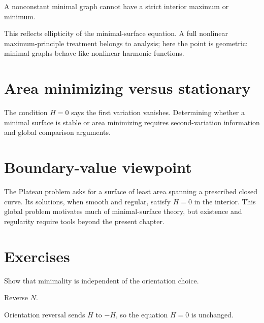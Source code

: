\begin{proposition}\label{prop:vii19-no-extrema}
A nonconstant minimal graph cannot have a strict interior maximum or minimum.
\end{proposition}

\begin{remark}
This reflects ellipticity of the minimal-surface equation.  A full nonlinear
maximum-principle treatment belongs to analysis; here the point is geometric:
minimal graphs behave like nonlinear harmonic functions.
\end{remark}

\section{Area minimizing versus stationary}

\begin{warning}\label{warn:vii19-stationary}
The condition \(H=0\) says the first variation vanishes.  Determining whether a
minimal surface is stable or area minimizing requires second-variation information
and global comparison arguments.
\end{warning}

\section{Boundary-value viewpoint}

The Plateau problem asks for a surface of least area spanning a prescribed closed
curve.  Its solutions, when smooth and regular, satisfy \(H=0\) in the interior.
This global problem motivates much of minimal-surface theory, but existence and
regularity require tools beyond the present chapter.

\section{Exercises}

\begin{exercise}\label{exr:vii19-01}
Show that minimality is independent of the orientation choice.
\end{exercise}
\begin{hint}
Reverse \(N\).
\end{hint}
\begin{solution}
Orientation reversal sends \(H\) to \(-H\), so the equation \(H=0\) is unchanged.
\end{solution}

